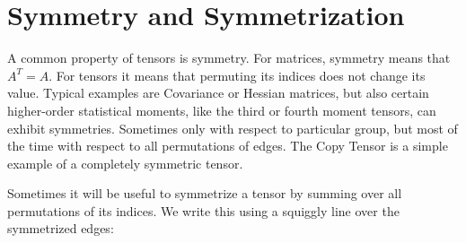 \section{Symmetry and Symmetrization}
\label{sec:symmetry}

A common property of tensors is symmetry.
For matrices, symmetry means that $A^T = A$.
For tensors it means that permuting its indices does not change its value.
Typical examples are Covariance or Hessian matrices,
but also certain higher-order statistical moments, like the third or fourth moment tensors, can exhibit symmetries.
Sometimes only with respect to particular group, but most of the time with respect to all permutations of edges.
The Copy Tensor is a simple example of a completely symmetric tensor.

Sometimes it will be useful to symmetrize a tensor by summing over all permutations of its indices.
We write this using a squiggly line over the symmetrized edges:
